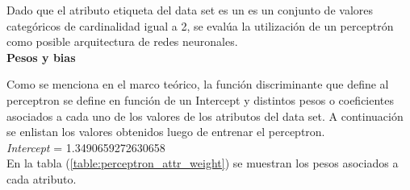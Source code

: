 \documentclass[osajnl,twocolumn,showpacs,superscriptaddress,10pt,floatfix]{revtex4-1} %
\begin{document}
Dado que el atributo etiqueta del data set es un es un conjunto de valores categóricos de cardinalidad igual a 2, se evalúa la utilización de un perceptrón como posible arquitectura de redes neuronales. \\

\textbf{Pesos y bias}

Como se menciona en el marco teórico, la función discriminante que define al perceptron se define en función de un Intercept y distintos pesos o coeficientes asociados a cada uno de los valores de los atributos del data set. A continuación se enlistan los valores obtenidos luego de entrenar el perceptron. \\

\textit{Intercept} = 1.3490659272630658 \\

En la tabla (\ref{table:perceptron_attr_weight}) se muestran los pesos asociados a cada atributo. \\

\begin{table}[h!]
    \centering
    \caption{Tabla de pesos para cada atributo utilizando un perceptrón.}
    \label{table:perceptron_attr_weight}
\end{table}
\end{document}
